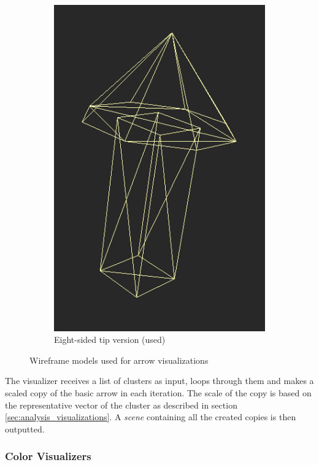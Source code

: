 \begin{figure}[h]
\begin{subfigure}{0.3\textwidth}
	\includegraphics[width=\textwidth]{./img/8sided_arrow.PNG}
    \caption{Eight-sided tip version (used)}
    \label{fig:8sided_arrow}
	\end{subfigure}
\caption[Wireframe models used for arrow visualizations]{Wireframe models used for arrow visualizations}
\end{figure}

The visualizer receives a list of clusters as input, loops through them and makes a scaled copy of the basic arrow in each iteration. The scale of the copy is based on the representative vector of the cluster as described in section \ref{sec:analysis_visualizations}. A {\it scene} containing all the created copies is then outputted.

\subsubsection{Color Visualizers}

